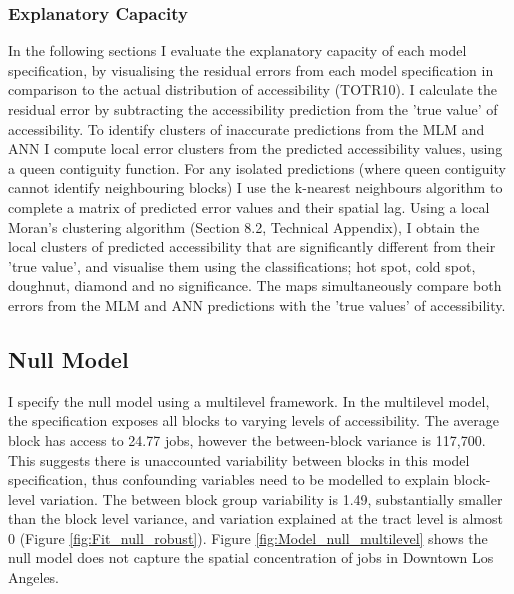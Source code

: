 \documentclass[a4paper,UKenglish]{lipics-v2018}
\begin{document}
\subsubsection{Explanatory Capacity}
In the following sections I evaluate the explanatory capacity of each model specification, by visualising the residual errors from each model specification in comparison to the actual distribution of accessibility (TOTR10). I calculate the residual error by subtracting the accessibility prediction from the 'true value' of accessibility. To identify clusters of inaccurate predictions from the MLM and ANN I compute local error clusters from the predicted accessibility values, using a queen contiguity function. For any isolated predictions (where queen contiguity cannot identify neighbouring blocks) I use the k-nearest neighbours algorithm to complete a matrix of predicted error values and their spatial lag. Using a local Moran's  clustering algorithm (Section 8.2, Technical Appendix), I obtain the local clusters of predicted accessibility that are significantly different from their 'true value', and visualise them using the classifications; hot spot, cold spot, doughnut, diamond and no significance. The maps simultaneously compare both errors from the MLM and ANN predictions with the 'true values' of accessibility.

\subsection{Null Model}
I specify the null model using a multilevel framework. In the multilevel model, the specification exposes all blocks to varying levels of accessibility. The average block has access to 24.77 jobs, however the between-block variance is 117,700. This suggests there is unaccounted variability between blocks in this model specification, thus confounding variables need to be modelled to explain block-level variation. The between block group variability is 1.49, substantially smaller than the block level variance, and variation explained at the tract level is almost 0 (Figure \ref{fig:Fit_null_robust}). Figure \ref{fig:Model_null_multilevel} shows the null model does not capture the spatial concentration of jobs in Downtown Los Angeles. 
\end{document}
